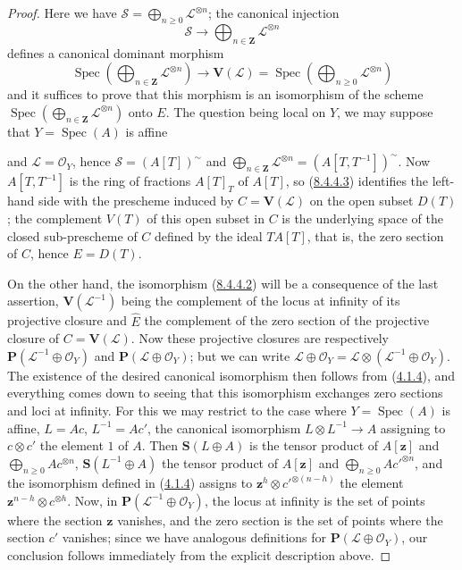 \begin{proof}
Here we have
$\mathcal{S}=\bigoplus_{n\geq0}\mathcal{L}^{\otimes n}$; the canonical
injection
\[
  \mathcal{S}\to\bigoplus_{n\in\mathbf{Z}}\mathcal{L}^{\otimes n}
\]
defines a canonical dominant morphism
\begin{equation}
\label{II.8.4.4.3}
  \operatorname{Spec}\left(
    \bigoplus_{n\in\mathbf{Z}}\mathcal{L}^{\otimes n}
  \right)
  \to\mathbf{V}(\mathcal{L})
  =\operatorname{Spec}\left(
    \bigoplus_{n\geq0}\mathcal{L}^{\otimes n}
  \right)
\tag{8.4.4.3}
\end{equation}
and it suffices to prove that this morphism is an isomorphism of the scheme
$\operatorname{Spec}(\bigoplus_{n\in\mathbf{Z}}\mathcal{L}^{\otimes n})$
onto $E$. The question being local on $Y$, we may suppose that
$Y=\operatorname{Spec}(A)$ is affine

and $\mathcal{L}=\mathcal{O}_Y$, hence $\mathcal{S}=(A[T])^{\sim}$ and
$\bigoplus_{n\in\mathbf{Z}}\mathcal{L}^{\otimes n}
=(A[T,T^{-1}])^{\sim}$. Now $A[T,T^{-1}]$ is the ring of fractions
$A[T]_T$ of $A[T]$, so (\hyperref[II.8.4.4.3]{8.4.4.3}) identifies the
left-hand side with the prescheme induced by $C=\mathbf{V}(\mathcal{L})$ on
the open subset $D(T)$; the complement $V(T)$ of this open subset in $C$ is
the underlying space of the closed sub-prescheme of $C$ defined by the ideal
$TA[T]$, that is, the zero section of $C$, hence $E=D(T)$.

On the other hand, the isomorphism (\hyperref[II.8.4.4.2]{8.4.4.2}) will be a
consequence of the last assertion, $\mathbf{V}(\mathcal{L}^{-1})$ being the
complement of the locus at infinity of its projective closure and $\widehat{E}$
the complement of the zero section of the projective closure of
$C=\mathbf{V}(\mathcal{L})$. Now these projective closures are
respectively $\mathbf{P}(\mathcal{L}^{-1}\oplus\mathcal{O}_Y)$ and
$\mathbf{P}(\mathcal{L}\oplus\mathcal{O}_Y)$; but we can write
$\mathcal{L}\oplus\mathcal{O}_Y
=\mathcal{L}\otimes(\mathcal{L}^{-1}\oplus\mathcal{O}_Y)$. The existence of
the desired canonical isomorphism then follows from
(\hyperref[II.4.1.4]{4.1.4}), and everything comes down to seeing that this isomorphism
exchanges zero sections and loci at infinity. For this we may restrict to the
case where $Y=\operatorname{Spec}(A)$ is affine,
$L=Ac$, $L^{-1}=Ac'$, the canonical isomorphism
$L\otimes L^{-1}\to A$ assigning to $c\otimes c'$ the element $1$
of $A$. Then $\mathbf{S}(L\oplus A)$ is the tensor product of $A[\mathbf{z}]$ and
$\bigoplus_{n\geq0}Ac^{\otimes n}$, $\mathbf{S}(L^{-1}\oplus A)$ the tensor
product of $A[\mathbf{z}]$ and $\bigoplus_{n\geq0}Ac'^{\otimes n}$, and
the isomorphism defined in (\hyperref[II.4.1.4]{4.1.4}) assigns to
$\mathbf{z}^h\otimes c'^{\otimes(n-h)}$ the element
$\mathbf{z}^{n-h}\otimes c^{\otimes h}$. Now, in
$\mathbf{P}(\mathcal{L}^{-1}\oplus\mathcal{O}_Y)$, the locus at infinity is
the set of points where the section $\mathbf{z}$ vanishes, and the zero section is
the set of points where the section $c'$ vanishes; since we have analogous
definitions for $\mathbf{P}(\mathcal{L}\oplus\mathcal{O}_Y)$, our conclusion
follows immediately from the explicit description above.
\end{proof}

